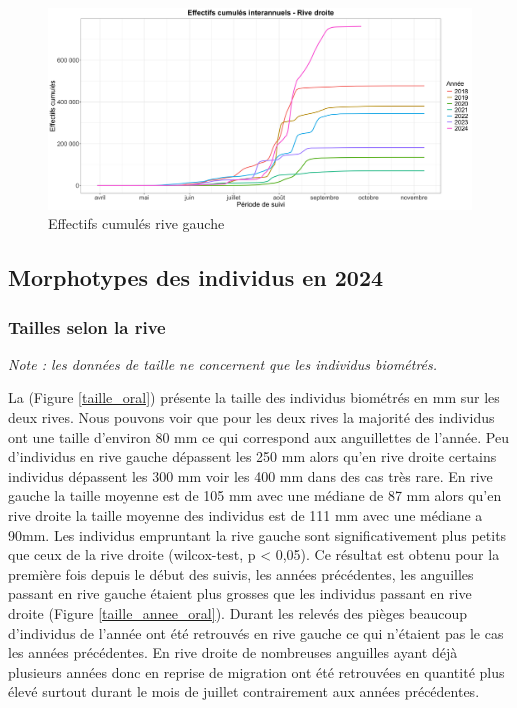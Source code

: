 \documentclass[11pt,titlepage,twoside]{article}\usepackage[]{graphicx}\usepackage[table]{xcolor}
\begin{document}
\begin{figure}[htpb]
\centering
\includegraphics[width=\textwidth]{g_RD.png}
\caption{Effectifs cumulés rive gauche}
\label{g_RD}
\end{figure}


\subsection{Morphotypes des individus en 2024}

\subsubsection{Tailles selon la rive}

\textit{Note : les données de taille ne concernent que les individus biométrés. }

La (Figure \ref{taille_oral}) présente la taille des individus biométrés en mm sur les deux rives. Nous pouvons voir que pour les deux rives la majorité des individus ont une taille d’environ 80 mm ce qui correspond aux anguillettes de l’année. Peu d’individus en rive gauche dépassent les 250 mm alors qu’en rive droite certains individus dépassent les 300 mm voir les 400 mm dans des cas très rare. En rive gauche la taille moyenne est de 105 mm avec une médiane de 87 mm alors qu’en rive droite la taille moyenne des individus est de 111 mm avec une médiane a 90mm. Les individus empruntant la rive gauche sont significativement plus petits que ceux de la rive droite (wilcox-test, p < 0,05). Ce résultat est obtenu pour la première fois depuis le début des suivis, les années précédentes, les anguilles passant en rive gauche étaient plus grosses que les individus passant en rive droite (Figure \ref{taille_annee_oral}). Durant les relevés des pièges beaucoup d’individus de l’année ont été retrouvés en rive gauche ce qui n’étaient pas le cas les années précédentes. En rive droite de nombreuses anguilles ayant déjà plusieurs années donc en reprise de migration ont été retrouvées en quantité plus élevé surtout durant le mois de juillet contrairement aux années précédentes. 
\end{document}
